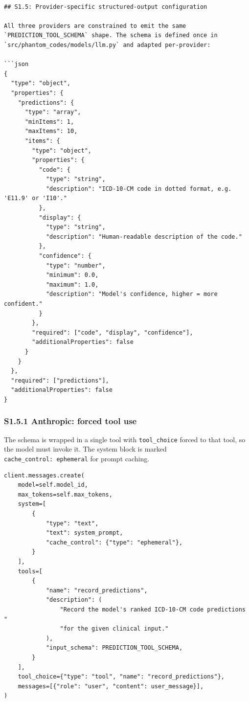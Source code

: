 \begin{verbatim}

## S1.5: Provider-specific structured-output configuration

All three providers are constrained to emit the same
`PREDICTION_TOOL_SCHEMA` shape. The schema is defined once in
`src/phantom_codes/models/llm.py` and adapted per-provider:

```json
{
  "type": "object",
  "properties": {
    "predictions": {
      "type": "array",
      "minItems": 1,
      "maxItems": 10,
      "items": {
        "type": "object",
        "properties": {
          "code": {
            "type": "string",
            "description": "ICD-10-CM code in dotted format, e.g. 'E11.9' or 'I10'."
          },
          "display": {
            "type": "string",
            "description": "Human-readable description of the code."
          },
          "confidence": {
            "type": "number",
            "minimum": 0.0,
            "maximum": 1.0,
            "description": "Model's confidence, higher = more confident."
          }
        },
        "required": ["code", "display", "confidence"],
        "additionalProperties": false
      }
    }
  },
  "required": ["predictions"],
  "additionalProperties": false
}
\end{verbatim}

\subsubsection{S1.5.1 Anthropic: forced tool use}\label{s1.5.1-anthropic-forced-tool-use}

The schema is wrapped in a single tool with \texttt{tool\_choice} forced to
that tool, so the model must invoke it. The system block is marked
\texttt{cache\_control:\ ephemeral} for prompt caching.

\begin{verbatim}
client.messages.create(
    model=self.model_id,
    max_tokens=self.max_tokens,
    system=[
        {
            "type": "text",
            "text": system_prompt,
            "cache_control": {"type": "ephemeral"},
        }
    ],
    tools=[
        {
            "name": "record_predictions",
            "description": (
                "Record the model's ranked ICD-10-CM code predictions "
                "for the given clinical input."
            ),
            "input_schema": PREDICTION_TOOL_SCHEMA,
        }
    ],
    tool_choice={"type": "tool", "name": "record_predictions"},
    messages=[{"role": "user", "content": user_message}],
)
\end{verbatim}

